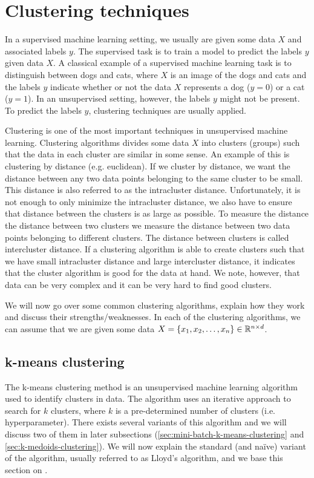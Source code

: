 \section{Clustering techniques}
In a supervised machine learning setting, we usually are given some data $X$ and associated labels $y$. The supervised task is to train a model to predict the labels $y$ given data $X$. A classical example of a supervised machine learning task is to distinguish between dogs and cats, where $X$ is an image of the dogs and cats and the labels $y$ indicate whether or not the data $X$ represents a dog ($y=0$) or a cat ($y=1$). In an unsupervised setting, however, the labels $y$ might not be present. To predict the labels $y$, clustering techniques are usually applied.

Clustering is one of the most important techniques in unsupervised machine learning. Clustering algorithms divides some data $X$ into clusters (groups) such that the data in each cluster are similar in some sense. An example of this is clustering by distance (e.g. euclidean). If we cluster by distance, we want the distance between any two data points belonging to the same cluster to be small. This distance is also referred to as the intracluster distance. Unfortunately, it is not enough to only minimize the intracluster distance, we also have to ensure that distance between the clusters is as large as possible. To measure the distance the distance between two clusters we measure the distance between two data points belonging to different clusters. The distance between clusters is called intercluster distance. If a clustering algorithm is able to create clusters such that we have small intracluster distance and large intercluster distance, it indicates that the cluster algorithm is good for the data at hand. We note, however, that data can be very complex and it can be very hard to find good clusters.

We will now go over some common clustering algorithms, explain how they work and discuss their strengths/weaknesses. In each of the clustering algorithms, we can assume that we are given some data $X = \left\{x_1, x_2, \ldots, x_n\right\} \in \mathbb{R}^{n \times d}$.

\subsection{k-means clustering}
The k-means clustering method \cite[Section 9.1]{bishop2006} is an unsupervised machine learning algorithm used to identify clusters in data. The algorithm uses an iterative approach to search for $k$ clusters, where $k$ is a pre-determined number of clusters (i.e. hyperparameter). There exists several variants of this algorithm and we will discuss two of them in later subsections (\cref{sec:mini-batch-k-means-clustering} and \cref{sec:k-medoids-clustering}). We will now explain the standard (and naïve) variant of the algorithm, usually referred to as Lloyd's algorithm, and we base this section on \cite[Section 9.1]{bishop2006}.

